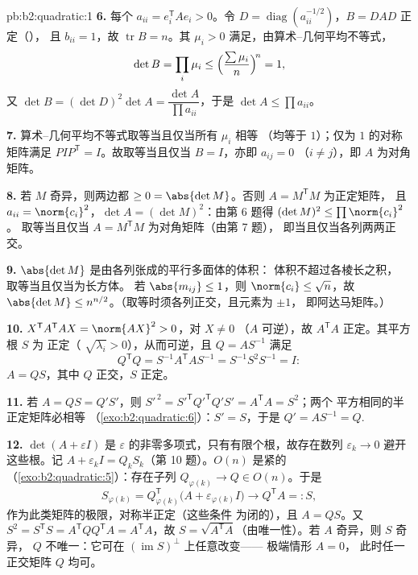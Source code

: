 \begin{solution}{pb:b2:quadratic:1}
\textbf{6.} 每个 $a_{ii} = e_i^{\mathsf T}Ae_i > 0$。令 $D =
\operatorname{diag}(a_{ii}^{-1/2})$，$B = DAD$ 正定（），
且 $b_{ii} = 1$，故 $\operatorname{tr}
B = n$。其 $\mu_i > 0$ 满足，由算术–几何平均不等式，
\[
\det B = \prod_i\mu_i
\leq \Bigl(\frac{\sum\mu_i}{n}\Bigr)^{\!n} = 1 ,
\]
又 $\det B = (\det D)^2\det A = \dfrac{\det A}{\prod
a_{ii}}$，于是 $\det A \leq \prod a_{ii}$。

\textbf{7.} 算术–几何平均不等式取等当且仅当所有 $\mu_i$ 相等
（均等于 $1$）；仅为 $1$ 的对称矩阵满足
$PIP^{\mathsf T} = I$。故取等当且仅当 $B = I$，亦即 $a_{ij} = 0$
（$i \neq j$），即 $A$ 为对角矩阵。

\textbf{8.} 若 $M$ 奇异，则两边都 $\geq 0 =
\abs{\det M}$。否则 $A = M^{\mathsf T}M$ 为正定矩阵，
且 $a_{ii} = \norm{c_i}^2$，$\det A = (\det
M)^2$：由第 6 题得 $(\det M)^2 \leq \prod\norm{c_i}^2$。
取等当且仅当 $A = M^{\mathsf T}M$ 为对角矩阵（由第 7 题），
即当且仅当各列两两正交。

\textbf{9.} $\abs{\det M}$ 是由各列张成的平行多面体的体积：
体积不超过各棱长之积，
取等当且仅当为长方体。
若 $\abs{m_{ij}} \leq 1$，则 $\norm{c_i} \leq \sqrt n$，故
$\abs{\det M} \leq n^{n/2}$。（取等时须各列正交，且元素为 $\pm1$，
即阿达马矩阵。）

\textbf{10.} $X^{\mathsf T}A^{\mathsf T}AX = \norm{AX}^2 > 0$，对 $X \neq 0$
（$A$ 可逆），故 $A^{\mathsf T}A$ 正定。其平方根 $S$ 为
正定（
$\sqrt{\lambda_i} > 0$），从而可逆，且 $Q = AS^{-1}$
满足
\[
Q^{\mathsf T}Q = S^{-1}A^{\mathsf T}AS^{-1}
= S^{-1}S^2S^{-1} = I :
\]
$A = QS$，其中 $Q$ 正交，$S$ 正定。

\textbf{11.} 若 $A = QS = Q'S'$，则 $S'^{\,2} =
S'^{\mathsf T}Q'^{\mathsf T}Q'S' = A^{\mathsf T}A = S^2$；两个
平方相同的半正定矩阵必相等
（\cref{exo:b2:quadratic:6}）：$S' = S$，于是 $Q' = AS^{-1} =
Q$.

\textbf{12.} $\det(A + \varepsilon I)$ 是
$\varepsilon$ 的非零多项式，只有有限个根，故存在数列
$\varepsilon_k \to 0$ 避开这些根。记 $A + \varepsilon_kI =
Q_kS_k$（第 10 题）。$O(n)$ 是紧的
（\cref{exo:b2:quadratic:5}）：存在子列 $Q_{\varphi(k)}
\to Q \in O(n)$。于是
\[
S_{\varphi(k)} = Q_{\varphi(k)}^{\mathsf T}
\bigl(A + \varepsilon_{\varphi(k)}I\bigr)
\longrightarrow Q^{\mathsf T}A =: S,
\]
作为此类矩阵的极限，对称半正定（这些条件
为闭的），且 $A = QS$。又 $S^2 = S^{\mathsf T}S =
A^{\mathsf T}QQ^{\mathsf T}A = A^{\mathsf T}A$，故 $S =
\sqrt{A^{\mathsf T}A}$（由唯一性）。若 $A$ 奇异，则 $S$ 奇异，
$Q$ 不唯一：它可在 $(\operatorname{im} S)^{\perp}$ 上任意改变——
极端情形 $A = 0$，
此时任一正交矩阵 $Q$ 均可。


\end{solution}
